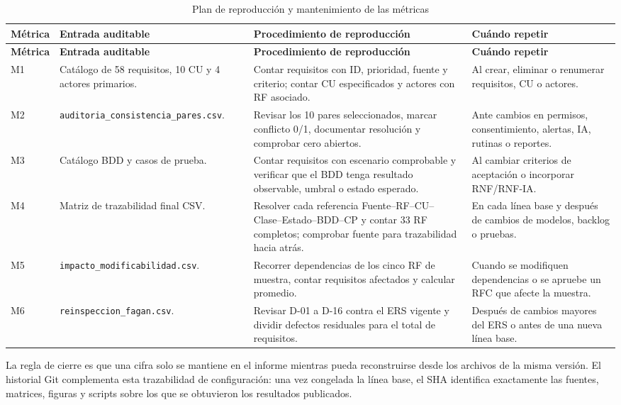 \documentclass[12pt,a4paper]{article}
\begin{document}
\begin{longtable}{p{}p{}p{}p{}}
\caption{Plan de reproducción y mantenimiento de las métricas}\\
\toprule
\textbf{Métrica}&\textbf{Entrada auditable}&\textbf{Procedimiento de reproducción}&\textbf{Cuándo repetir}\\
\midrule\endfirsthead
\toprule
\textbf{Métrica}&\textbf{Entrada auditable}&\textbf{Procedimiento de reproducción}&\textbf{Cuándo repetir}\\
\midrule\endhead
M1&Catálogo de 58 requisitos, 10 CU y 4 actores primarios.&Contar requisitos con ID, prioridad, fuente y criterio; contar CU especificados y actores con RF asociado.&Al crear, eliminar o renumerar requisitos, CU o actores.\\
M2&\texttt{auditoria\_consistencia\_pares.csv}.&Revisar los 10 pares seleccionados, marcar conflicto 0/1, documentar resolución y comprobar cero abiertos.&Ante cambios en permisos, consentimiento, alertas, IA, rutinas o reportes.\\
M3&Catálogo BDD y casos de prueba.&Contar requisitos con escenario comprobable y verificar que el BDD tenga resultado observable, umbral o estado esperado.&Al cambiar criterios de aceptación o incorporar RNF/RNF-IA.\\
M4&Matriz de trazabilidad final CSV.&Resolver cada referencia Fuente--RF--CU--Clase--Estado--BDD--CP y contar 33 RF completos; comprobar fuente para trazabilidad hacia atrás.&En cada línea base y después de cambios de modelos, backlog o pruebas.\\
M5&\texttt{impacto\_modificabilidad.csv}.&Recorrer dependencias de los cinco RF de muestra, contar requisitos afectados y calcular promedio.&Cuando se modifiquen dependencias o se apruebe un RFC que afecte la muestra.\\
M6&\texttt{reinspeccion\_fagan.csv}.&Revisar D-01 a D-16 contra el ERS vigente y dividir defectos residuales para el total de requisitos.&Después de cambios mayores del ERS o antes de una nueva línea base.\\
\bottomrule\end{longtable}

La regla de cierre es que una cifra solo se mantiene en el informe mientras pueda reconstruirse desde los archivos de la misma versión. El historial Git complementa esta trazabilidad de configuración: una vez congelada la línea base, el SHA identifica exactamente las fuentes, matrices, figuras y scripts sobre los que se obtuvieron los resultados publicados.
\end{document}
